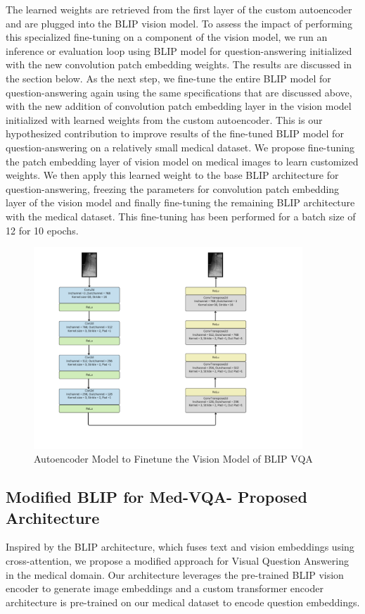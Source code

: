 \documentclass[pdflatex,sn-mathphys-num]{sn-jnl}%
\begin{document}
The learned weights are retrieved from the first layer of the custom autoencoder and are plugged into the BLIP vision model. To assess the impact of performing this specialized fine-tuning on a component of the vision model, we run an inference or evaluation loop using BLIP model for question-answering initialized with the new convolution patch embedding weights. The results are discussed in the section below. 
As the next step, we fine-tune the entire BLIP model for question-answering again using the same specifications that are discussed above, with the new addition of convolution patch embedding layer in the vision model initialized with learned weights from the custom autoencoder. This is our hypothesized contribution to improve results of the fine-tuned BLIP model for question-answering on a relatively small medical dataset. We propose fine-tuning the patch embedding layer of vision model on medical images to learn customized weights. We then apply this learned weight to the base BLIP architecture for question-answering, freezing the parameters for convolution patch embedding layer of the vision model and finally fine-tuning the remaining BLIP architecture with the medical dataset. This fine-tuning has been performed for a batch size of 12 for 10 epochs. 

\begin{figure}[h]
\includegraphics[width=0.9\textwidth]{figs/autoencoder.png}
\caption{Autoencoder Model to Finetune the Vision Model of BLIP VQA}
\centering
\end{figure}

\subsection{Modified BLIP for Med-VQA- Proposed Architecture}\label{subsec3.4}
Inspired by the BLIP architecture, which fuses text and vision embeddings using cross-attention, we propose a modified approach for Visual Question Answering in the medical domain. Our architecture leverages the pre-trained BLIP vision encoder to generate image embeddings and a custom transformer encoder architecture is pre-trained on our medical dataset to encode question embeddings.
\end{document}
